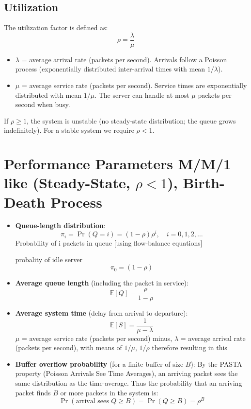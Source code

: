 \subsection*{Utilization}
The utilization factor is defined as:
\[
\rho = \frac{\lambda}{\mu}
\]
\begin{itemize}
    \item \(\lambda\) = average arrival rate (packets per second).  
          Arrivals follow a Poisson process (exponentially distributed inter-arrival times with mean \(1/\lambda\)).
    \item \(\mu\) = average service rate (packets per second).  
          Service times are exponentially distributed with mean \(1/\mu\).  
          The server can handle at most \(\mu\) packets per second when busy.
\end{itemize}
If \(\rho \ge 1\), the system is unstable (no steady-state distribution; the queue grows indefinitely).  
For a stable system we require \(\rho < 1\).

\section{Performance Parameters M/M/1 like (Steady-State, \(\rho < 1\)), Birth-Death Process}

\begin{itemize}
    \item \textbf{Queue-length distribution}:
    \[
    \pi_i = \Pr(Q = i) = (1 - \rho) \rho^i, \quad i = 0,1,2,\dots
    \]
    Probability of i packets in queue [using flow-balance equations]

    probality of idle server
    \[
    \pi_0  = (1 - \rho)
    \]
    \item \textbf{Average queue length} (including the packet in service):
    \[
    \mathbb{E}[Q] = \frac{\rho}{1 - \rho}
    \]
    \item \textbf{Average system time} (delay from arrival to departure):
    \[
    \mathbb{E}[S] = \frac{1}{\mu - \lambda}
    \]
    \(\mu\) = average service rate (packets per second) minus, \(\lambda\) = average arrival rate (packets per second), with means of \(1/\mu\), \(1/\rho\) therefore resulting in this
    \item \textbf{Buffer overflow probability} (for a finite buffer of size \(B\)):
    By the PASTA property (Poisson Arrivals See Time Averages), an arriving packet sees the same distribution as the time-average. Thus the probability that an arriving packet finds \(B\) or more packets in the system is:
    \[
    \Pr(\text{arrival sees } Q \ge B) = \Pr(Q \ge B) = \rho^B
    \]
\end{itemize}

